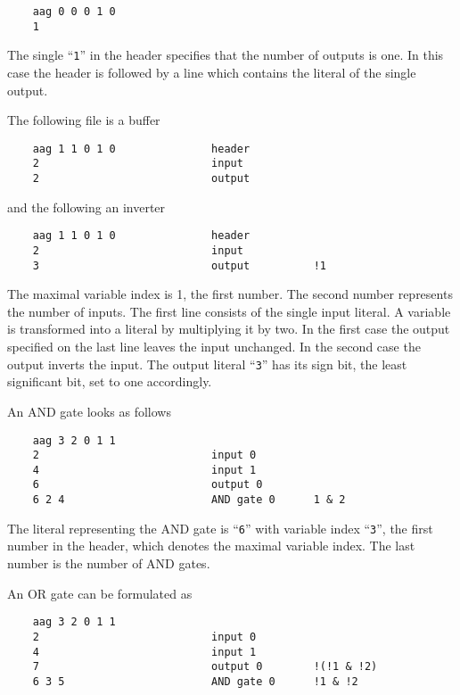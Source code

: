 \documentclass[10pt]{llncs}
\begin{document}
\begin{verbatim}
    aag 0 0 0 1 0
    1
\end{verbatim}

  The single ``\texttt{1}'' in the header specifies that the number of outputs is one.
  In this case the header is followed by a line which contains the literal
  of the single output.

  The following file is a buffer

\begin{verbatim}
    aag 1 1 0 1 0               header
    2                           input
    2                           output
\end{verbatim}

  and the following an inverter

\begin{verbatim}
    aag 1 1 0 1 0               header
    2                           input
    3                           output          !1
\end{verbatim}

  The maximal variable index is 1, the first number.  The second number
  represents the number of inputs.  The first line consists of the single
  input literal.  A variable is transformed into a literal by multiplying
  it by two.  In the first case the output specified on the last line leaves
  the input unchanged.  In the second case the output inverts the input.  The
  output literal ``\texttt{3}'' has its sign bit, the least significant bit, set to one
  accordingly.
  
  An AND gate looks as follows

\begin{verbatim}
    aag 3 2 0 1 1
    2                           input 0
    4                           input 1
    6                           output 0
    6 2 4                       AND gate 0      1 & 2
\end{verbatim}

  The literal representing the AND gate is ``\texttt{6}'' with variable index
  ``\texttt{3}'',
  the first number in the header, which denotes the maximal variable index.
  The last number is the number of AND gates.

  An OR gate can be formulated as

\begin{verbatim}
    aag 3 2 0 1 1
    2                           input 0
    4                           input 1
    7                           output 0        !(!1 & !2)
    6 3 5                       AND gate 0      !1 & !2
\end{verbatim}
\end{document}
